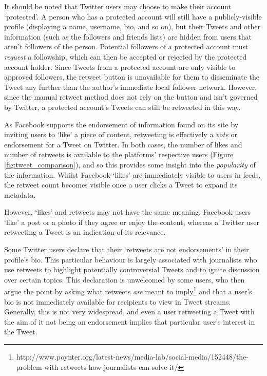 It should be noted that Twitter users may choose to make their account `protected'. A person who has a protected account will still have a publicly-visible profile (displaying a name, username, bio, and so on), but their Tweets and other information (such as the followers and friends lists) are hidden from users that aren't followers of the person. Potential followers of a protected account must \textit{request} a followship, which can then be accepted or rejected by the protected account holder. Since Tweets from a protected account are only visible to approved followers, the retweet button is unavailable for them to disseminate the Tweet any further than the author's immediate local follower network. However, since the manual retweet method does not rely on the button and isn't governed by Twitter, a protected account's Tweets can still be retweeted in this way.

As Facebook supports the endorsement of information found on its site by inviting users to `like' a piece of content, retweeting is effectively a \textit{vote} or endorsement for a Tweet on Twitter. In both cases, the number of likes and number of retweets is available to the platforms' respective users (Figure \ref{fig:tweet_comparison}), and so this provides some insight into the \textit{popularity} of the information. Whilst Facebook `likes' are immediately visible to users in feeds, the retweet count becomes visible once a user clicks a Tweet to expand its metadata.

However, `likes' and retweets may not have the same meaning. Facebook users `like' a post or a photo if they agree or enjoy the content, whereas a Twitter user retweeting a Tweet is an indication of its relevance. 

Some Twitter users declare that their `retweets are not endorsements' in their profile's bio. This particular behaviour is largely associated with journalists who use retweets to highlight potentially controversial Tweets and to ignite discussion over certain topics. This declaration is unwelcomed by some users, who then argue the point by asking what retweets \textit{are} meant to imply\footnote{http://www.poynter.org/latest-news/media-lab/social-media/152448/the-problem-with-retweets-how-journalists-can-solve-it/} and that a user's bio is not immediately available for recipients to view in Tweet streams. Generally, this is not very widespread, and even a user retweeting a Tweet with the aim of it not being an endorsement implies that particular user's interest in the Tweet.


